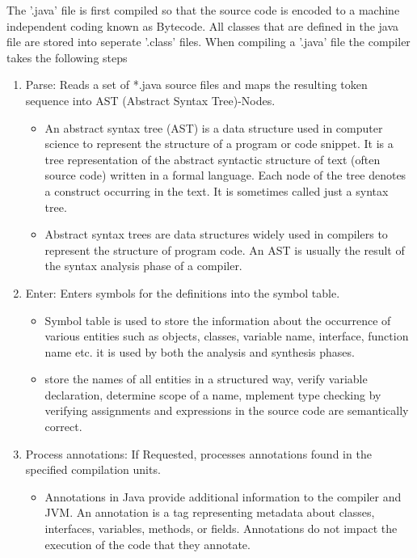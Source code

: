 \documentclass{article}
\begin{document}
The '.java' file is first compiled  so that the source code is encoded to a machine independent coding known as Bytecode.
All classes that are defined in the java file are stored into seperate '.class' files. When compiling a '.java' file the compiler takes the following steps
\begin{enumerate}
    \item Parse: Reads a set of *.java source files and maps the resulting token sequence into AST (Abstract Syntax Tree)-Nodes.
    \begin{itemize}
        \item An abstract syntax tree (AST) is a data structure used in computer science to represent the structure of a program or code snippet. It is a tree representation of the abstract syntactic structure of text (often source code) written in a formal language. Each node of the tree denotes a construct occurring in the text. It is sometimes called just a syntax tree.
        \item Abstract syntax trees are data structures widely used in compilers to represent the structure of program code. An AST is usually the result of the syntax analysis phase of a compiler.
    \end{itemize}
    \item Enter: Enters symbols for the definitions into the symbol table.
    \begin{itemize}
        \item Symbol table is used to store the information about the occurrence of various entities such as objects, classes, variable name, interface, function name etc. it is used by both the analysis and synthesis phases.
        \item store the names of all entities in a structured way, verify variable declaration, determine scope of a name, mplement type checking by verifying assignments and expressions in the source code are semantically correct. 
    \end{itemize}
    \item Process annotations: If Requested, processes annotations found in the specified compilation units.
    \begin{itemize}
        \item Annotations in Java provide additional information to the compiler and JVM. An annotation is a tag representing metadata about classes, interfaces, variables, methods, or fields. Annotations do not impact the execution of the code that they annotate.
    \end{itemize}

\end{enumerate}
\end{document}

